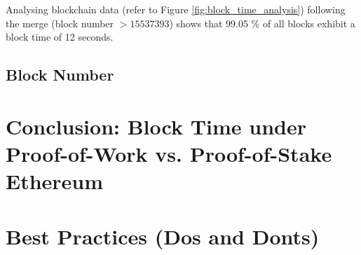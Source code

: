 Analysing blockchain data (refer to Figure \ref{fig:block_time_analysis}) following the
merge (block number $> 15537393$) shows that 99.05 \% of all blocks exhibit a
block time of 12 seconds.

\subsection{Block Number}


\section{Conclusion: Block Time under Proof-of-Work vs. Proof-of-Stake Ethereum}
\section{Best Practices (Dos and Donts)}

